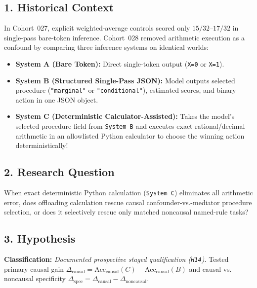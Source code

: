 \subsection*{1. Historical Context}
In Cohort~027, explicit weighted-average controls scored only $15/32$--$17/32$ in single-pass bare-token inference. Cohort~028 removed arithmetic execution as a confound by comparing three inference systems on identical worlds:
\begin{itemize}
  \item \textbf{System A (Bare Token):} Direct single-token output (\texttt{X=0} or \texttt{X=1}).
  \item \textbf{System B (Structured Single-Pass JSON):} Model outputs selected procedure (\texttt{"marginal"} or \texttt{"conditional"}), estimated scores, and binary action in one JSON object.
  \item \textbf{System C (Deterministic Calculator-Assisted):} Takes the model's selected procedure field from \texttt{System B} and executes exact rational/decimal arithmetic in an allowlisted Python calculator to choose the winning action deterministically!
\end{itemize}

\subsection*{2. Research Question}
When exact deterministic Python calculation (\texttt{System C}) eliminates all arithmetic error, does offloading calculation rescue causal confounder-vs.-mediator procedure selection, or does it selectively rescue only matched noncausal named-rule tasks?

\subsection*{3. Hypothesis}
\textbf{Classification:} \emph{Documented prospective staged qualification (\texttt{H14}).} Tested primary causal gain $\Delta_{\mathrm{causal}} = \mathrm{Acc}_{\mathrm{causal}}(C) - \mathrm{Acc}_{\mathrm{causal}}(B)$ and causal-vs.-noncausal specificity $\Delta_{\mathrm{spec}} = \Delta_{\mathrm{causal}} - \Delta_{\mathrm{noncausal}}$.

